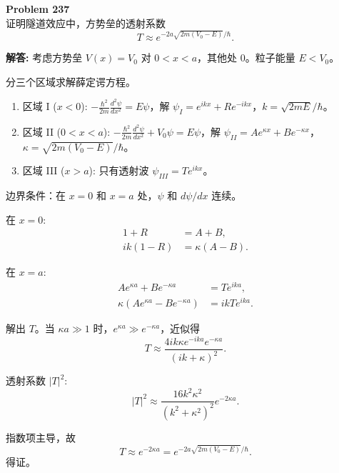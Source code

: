 \documentclass[12pt, a4paper, oneside]{ctexart}
\newenvironment{solution}{\par\noindent\textbf{解答:}\quad}{\par}
\begin{document}
\begin{mdframed}[backgroundcolor=gray!10, linewidth=0pt]
    \textbf{Problem 237} \\
    证明隧道效应中，方势垒的透射系数
    \[
    T \approx e^{-2a \sqrt{2m(V_0 - E)} / \hbar}.
    \]
\end{mdframed}
\begin{solution}
    考虑方势垒 $V(x) = V_0$ 对 $0 < x < a$，其他处 $0$。粒子能量 $E < V_0$。
    
    分三个区域求解薛定谔方程。
    \begin{enumerate}
        \item 区域 I ($x<0$): $-\frac{\hbar^2}{2m} \frac{d^2\psi}{dx^2} = E\psi$，解 $\psi_I = e^{ikx} + R e^{-ikx}$，$k = \sqrt{2mE}/\hbar$。
        \item 区域 II ($0<x<a$): $-\frac{\hbar^2}{2m} \frac{d^2\psi}{dx^2} + V_0 \psi = E\psi$，解 $\psi_{II} = A e^{\kappa x} + B e^{-\kappa x}$，$\kappa = \sqrt{2m(V_0 - E)}/\hbar$。
        \item 区域 III ($x>a$): 只有透射波 $\psi_{III} = T e^{ikx}$。
    \end{enumerate}
    
    边界条件：在 $x=0$ 和 $x=a$ 处，$\psi$ 和 $d\psi/dx$ 连续。
    
    在 $x=0$:
    \begin{align}
        1 + R &= A + B, \\
        ik(1 - R) &= \kappa (A - B).
    \end{align}
    
    在 $x=a$:
    \begin{align}
        A e^{\kappa a} + B e^{-\kappa a} &= T e^{ika}, \\
        \kappa (A e^{\kappa a} - B e^{-\kappa a}) &= ik T e^{ika}.
    \end{align}
    
    解出 $T$。当 $\kappa a \gg 1$ 时，$e^{\kappa a} \gg e^{-\kappa a}$，近似得
    \[
    T \approx \frac{4ik\kappa e^{-ika} e^{-\kappa a}}{(ik+\kappa)^2}.
    \]
    
    透射系数 $|T|^2$:
    \[
    |T|^2 \approx \frac{16k^2\kappa^2}{(k^2+\kappa^2)^2} e^{-2\kappa a}.
    \]
    
    指数项主导，故
    \[
    T \approx e^{-2\kappa a} = e^{-2a \sqrt{2m(V_0 - E)} / \hbar}.
    \]
    得证。
\end{solution}
\end{document}
